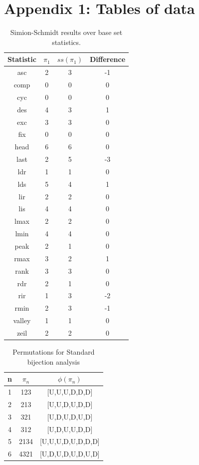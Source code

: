 \documentclass[12pt]{article}
\begin{document}
\section{Appendix 1: Tables of data}
\begin{table}[H]
\caption{Simion-Schmidt results over base set statistics.}
\centering
\begin{tabular}{c | c c c}
\hline\hline
Statistic & $\pi_1$ & $ss(\pi_1)$ & Difference \\ [0.5ex]
\hline
asc & 2 & 3 & -1 \\ 
comp & 0 & 0 & 0 \\
cyc & 0 & 0 & 0 \\
des & 4 & 3 & 1 \\
exc & 3 & 3 & 0 \\
fix & 0 & 0 & 0 \\
head & 6 & 6 & 0 \\
last & 2 & 5 & -3 \\
ldr & 1 & 1 & 0 \\
lds & 5 & 4 & 1 \\
lir & 2 & 2 & 0 \\
lis & 4 & 4 & 0 \\
lmax & 2 & 2 & 0 \\
lmin & 4 & 4 & 0 \\
peak & 2 & 1 & 0 \\
rmax & 3 & 2 & 1 \\
rank & 3 & 3 & 0 \\
rdr & 2 & 1 & 0 \\
rir & 1 & 3 & -2 \\
rmin & 2 & 3 & -1 \\
valley & 1 & 1 & 0 \\
zeil & 2 & 2 & 0 \\
\hline
\end{tabular}
\label{table:simionschmidt1}
\end{table}
\newpage

\begin{table}[H]
\caption{Permutations for Standard bijection analysis}
\centering
\begin{tabular}{c | c c}
\hline\hline
n & $\pi_n$ & $\phi(\pi_n)$ \\ [0.5ex]
\hline
1 & 123 & [U,U,U,D,D,D] \\
2 & 213 & [U,U,D,U,D,D] \\
3 & 321 & [U,D,U,D,U,D] \\
4 & 312 & [U,D,U,U,D,D] \\
5 & 2134 & [U,U,U,D,U,D,D,D] \\
6 & 4321 & [U,D,U,D,U,D,U,D] \\
\hline
\end{tabular}
\label{table:StandardPerms}
\end{table}
\end{document}
